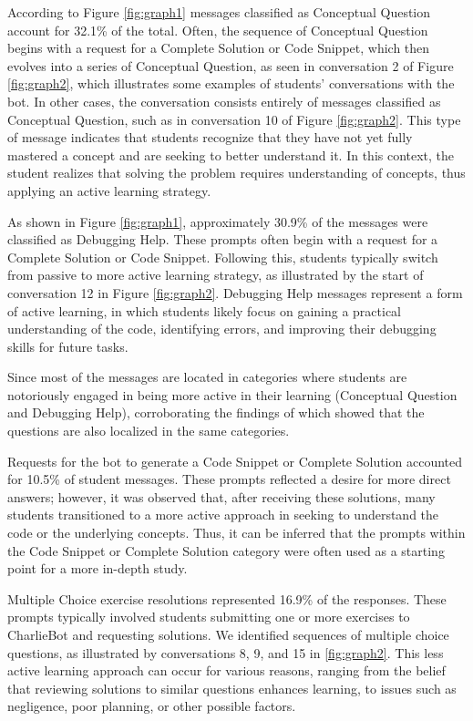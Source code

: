 \documentclass[a4paper,twoside]{article}
\begin{document}
According to Figure \ref{fig:graph1} messages classified as
Conceptual Question account for 32.1\% of the total. Often, the sequence of
Conceptual Question begins with a request for a Complete Solution or Code
Snippet, which then evolves into a series of Conceptual Question, as seen in
conversation 2 of Figure \ref{fig:graph2}, which illustrates some examples of
students' conversations with the bot. In other cases, the conversation
consists entirely of messages classified as Conceptual Question, such as in
conversation 10 of Figure \ref{fig:graph2}. This type of message indicates that
students recognize that they have not yet fully mastered a concept and are
seeking to better understand it. In this context, the student realizes that
solving the problem requires understanding of concepts, thus applying an active
learning strategy.

As shown in Figure \ref{fig:graph1}, approximately 30.9\% of the messages were
classified as Debugging Help. These prompts often begin with a request for a
Complete Solution or Code Snippet. Following this, students typically switch from
passive to more active learning strategy, as illustrated by the start
of conversation 12 in Figure \ref{fig:graph2}. Debugging Help messages represent
a form of active learning, in which students likely focus on gaining a practical
understanding of the code, identifying errors, and improving their debugging
skills for future tasks.

Since most of the messages are located in categories where students are
notoriously engaged in being more active in their learning (Conceptual Question
and Debugging Help), corroborating the findings of \cite{Ghimire24} which
showed that the questions are also localized in the same categories.

Requests for the bot to generate a Code Snippet or Complete Solution accounted
for 10.5\% of student messages. These prompts reflected a desire for more
direct answers; however, it was observed that, after receiving these solutions,
many students transitioned to a more active approach in seeking to understand
the code or the underlying concepts. Thus, it can be inferred that the prompts
within the Code Snippet or Complete Solution category were often used as a
starting point for a more in-depth study.

Multiple Choice exercise resolutions represented 16.9\% of the responses.
These prompts typically involved students submitting one or more exercises to
CharlieBot and requesting solutions. We identified sequences of multiple choice
questions, as illustrated by conversations 8, 9, and 15 in \ref{fig:graph2}.
This less active learning approach can occur for various reasons, ranging from
the belief that reviewing solutions to similar questions enhances learning, to
issues such as negligence, poor planning, or other possible factors.
\end{document}
